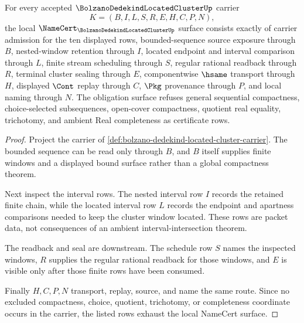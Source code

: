 \begin{theorem}
\label{thm:bolzano-dedekind-located-cluster-namecert-obligations}
For every accepted $\BolzanoDedekindLocatedClusterUp$ carrier
$$
K=(B,I,L,S,R,E,H,C,P,N),
$$
the local $\NameCert_{\BolzanoDedekindLocatedClusterUp}$ surface consists exactly of carrier admission for the ten displayed rows, bounded-sequence source exposure through $B$, nested-window retention through $I$, located endpoint and interval comparison through $L$, finite stream scheduling through $S$, regular rational readback through $R$, terminal cluster sealing through $E$, componentwise $\hsame$ transport through $H$, displayed $\Cont$ replay through $C$, $\Pkg$ provenance through $P$, and local naming through $N$. The obligation surface refuses general sequential compactness, choice-selected subsequences, open-cover compactness, quotient real equality, trichotomy, and ambient Real completeness as certificate rows.
\end{theorem}
\begin{proof}
Project the carrier of \autoref{def:bolzano-dedekind-located-cluster-carrier}. The bounded sequence can be read only through $B$, and $B$ itself supplies finite windows and a displayed bound surface rather than a global compactness theorem.

Next inspect the interval rows. The nested interval row $I$ records the retained finite chain, while the located interval row $L$ records the endpoint and apartness comparisons needed to keep the cluster window located. These rows are packet data, not consequences of an ambient interval-intersection theorem.

The readback and seal are downstream. The schedule row $S$ names the inspected windows, $R$ supplies the regular rational readback for those windows, and $E$ is visible only after those finite rows have been consumed.

Finally $H,C,P,N$ transport, replay, source, and name the same route. Since no excluded compactness, choice, quotient, trichotomy, or completeness coordinate occurs in the carrier, the listed rows exhaust the local NameCert surface.
\end{proof}

